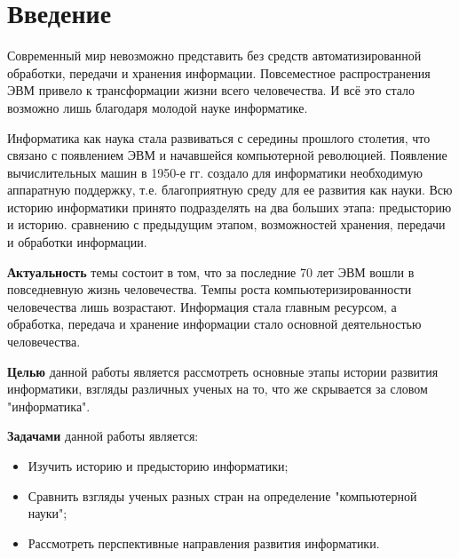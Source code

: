 \chapter*{Введение}							%


Современный мир невозможно представить без средств автоматизированной обработки, передачи и хранения информации. Повсеместное распространения ЭВМ привело к трансформации жизни всего человечества. И всё это стало возможно лишь благодаря молодой науке информатике.

Информатика как наука стала развиваться с середины прошлого столетия, что связано с появлением ЭВМ и начавшейся компьютерной революцией. Появление вычислительных машин в 1950-е гг. создало для информатики необходимую аппаратную поддержку, т.е. благоприятную среду для ее развития как науки. Всю историю информатики принято подразделять на два больших этапа: предысторию и историю.
 сравнению с предыдущим этапом, возможностей хранения, передачи и обработки информации.

\textbf{Актуальность} темы состоит в том, что за последние 70 лет ЭВМ вошли  в повседневную жизнь человечества. Темпы роста компьютеризированности человечества лишь возрастают. Информация стала главным ресурсом, а обработка, передача и хранение информации стало основной деятельностью человечества.  

\textbf{Целью} данной работы является рассмотреть основные этапы истории развития информатики, взгляды различных ученых на то, что же скрывается за словом "информатика".

\textbf{Задачами} данной работы является:
\begin{itemize}
\item Изучить историю и предысторию информатики;
\item Сравнить взгляды ученых разных стран на определение "компьютерной науки";
\item Рассмотреть перспективные направления развития информатики.
\end{itemize}

\clearpage
